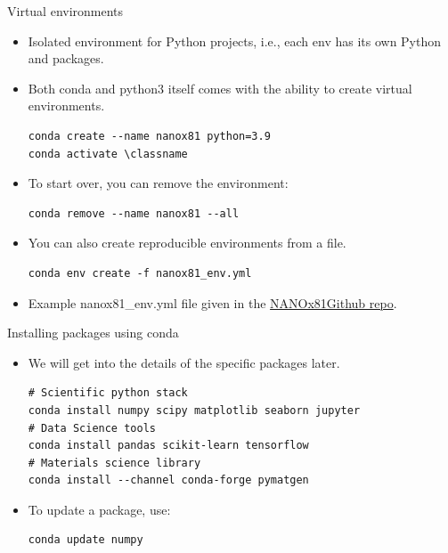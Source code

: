 \documentclass[aspectratio=169]{beamer}
\newcommand{\classname}{NANOx81}
\begin{document}
    \begin{frame}[fragile]{Virtual environments}
        \begin{itemize}
            \item Isolated environment for Python projects, i.e., each env has its own Python and packages.
            \item Both conda and python3 itself comes with the ability to create virtual environments.
            \begin{verbatim}
conda create --name nanox81 python=3.9
conda activate \classname
            \end{verbatim}
            \item To start over, you can remove the environment:
            \begin{verbatim}
conda remove --name nanox81 --all
            \end{verbatim}
            \item You can also create reproducible environments from a file.
            \begin{verbatim}
conda env create -f nanox81_env.yml
            \end{verbatim}
            \item Example nanox81\_env.yml file given in the \href{https://github.com/materialsvirtuallab/\classname}{\classname Github repo}.
        \end{itemize}
    \end{frame}


    \begin{frame}[fragile]{Installing packages using conda}
        \begin{itemize}
            \item We will get into the details of the specific packages later.
            \begin{verbatim}
# Scientific python stack
conda install numpy scipy matplotlib seaborn jupyter
# Data Science tools
conda install pandas scikit-learn tensorflow
# Materials science library
conda install --channel conda-forge pymatgen
            \end{verbatim}
            \item To update a package, use:
            \begin{verbatim}
conda update numpy
            \end{verbatim}
        \end{itemize}
    \end{frame}
\end{document}
